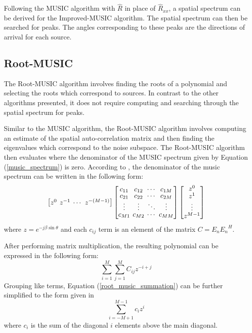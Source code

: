 \documentclass[conference]{IEEEtran}
\begin{document}
		Following the MUSIC algorithm with $\hat{R}$ in place of $\hat{R}_{xx}$, a spatial spectrum can be derived for the Improved-MUSIC algorithm. The spatial spectrum can then be searched for peaks. The angles corresponding to these peaks are the directions of arrival for each source.
			
	\subsection{Root-MUSIC}
		
		The Root-MUSIC algorithm involves finding the roots of a polynomial and selecting the roots which correspond to sources. In contrast to the other algorithms presented, it does not require computing and searching through the spatial spectrum for peaks.
		
		Similar to the MUSIC algorithm, the Root-MUSIC algorithm involves computing an estimate of the spatial auto-correlation matrix and then finding the eigenvalues which correspond to the noise subspace. The Root-MUSIC algorithm then evaluates where the denominator of the MUSIC spectrum given by Equation (\ref{music_spectrum}) is zero. According to \cite{root_music_ko}, the denominator of the music spectrum can be written in the following form:
		\begin{equation}
			\setlength{\arraycolsep}{2pt}
			\renewcommand{\arraystretch}{0.8}
			\begin{bmatrix}z^0 & z^{-1} & \cdots & z^{-(M-1)}\end{bmatrix}\begin{bmatrix}c_{11} & c_{12} & \cdots & c_{1M}\\ c_{21} & c_{22} & \cdots & c_{2M}\\ \vdots & \vdots & \ddots & \vdots\\ c_{M1} & c_{M2} & \cdots & c_{MM}\end{bmatrix}\begin{bmatrix}z^0 \\ z^1 \\ \vdots \\ z^{M-1}\end{bmatrix}
		\end{equation}
		where $z = e^{-j{\beta}\sin{\theta}}$ and each $c_{ij}$ term is an element of the matrix $C = E_{n}{E_{n}}^H$.
		
		After performing matrix multiplication, the resulting polynomial can be expressed in the following form:
		\begin{equation}
			\label{root_music_summation}
			\sum_{i=1}^{M}{\sum_{j=1}^{M}{C_{ij}z^{-i+j}}}
		\end{equation}
		Grouping like terms, Equation (\ref{root_music_summation}) can be further simplified to the form given in \cite{doa_algorithms_raghu}
		\begin{equation}
			\label{root_music_summation_simplified}
		 	\sum_{i=-M+1}^{M-1}{c_iz^i}
		\end{equation}
		where $c_i$ is the sum of the diagonal $i$ elements above the main diagonal.
		
\end{document}
